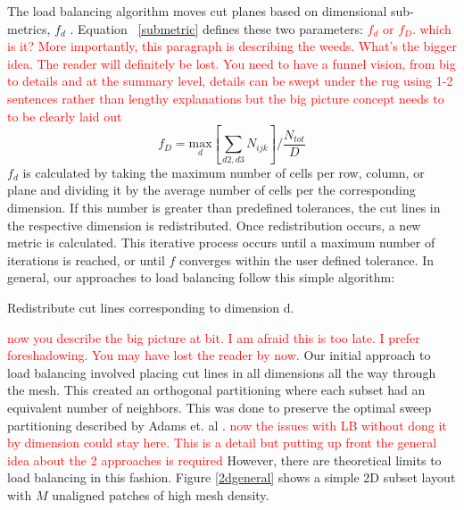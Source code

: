 \documentclass[letterpaper]{mandc2019}
\newcommand{\jcr}[1]{\textcolor{red}{#1}}
\begin{document}
The load balancing algorithm moves cut planes based on dimensional sub-metrics, $f_d$ . Equation ~\eqref{submetric} defines these two parameters:
\jcr{$f_d$ or $f_D$. which is it? More importantly, this paragraph is describing the weeds. What's the bigger idea. The reader will definitely be lost. You need to have a funnel vision, from big to details and at the summary level, details can be swept under the rug using 1-2 sentences rather than lengthy explanations but the big picture concept needs to to be clearly laid out}
\begin{equation}
f_{D} = \underset{d}{\text{max}}[\sum_{d2,d3} N_{ijk}]/\frac{N_{tot}}{D}
\label{submetric}
\end{equation}
$f_{d}$ is calculated by taking the maximum number of cells per row, column, or plane and dividing it by the average number of cells per the corresponding dimension. If this number is greater than predefined tolerances, the cut lines in the respective dimension is redistributed. Once redistribution occurs, a new metric is calculated. This iterative process occurs until a maximum number of iterations is reached, or until $f$ converges within the user defined tolerance. In general, our approaches to load balancing follow this simple algorithm:

\begin{algorithm}
\begin{algorithmic}

		\STATE Redistribute cut lines corresponding to dimension d.
	\ENDIF	
\ENDFOR
\ENDWHILE
\end{algorithmic}
\end{algorithm}

\jcr{now you describe the big picture at bit. I am afraid this is too late. I prefer foreshadowing. You may have lost the reader by now.}
Our initial approach to load balancing involved placing cut lines in all dimensions all the way through the mesh. This created an orthogonal partitioning where each subset had an equivalent number of neighbors. This was done to preserve the optimal sweep partitioning described by Adams et. al \cite{mpadams2015}. \jcr{now the issues with LB without dong it by dimension could stay here. This is a detail but putting up front the general idea about the 2 approaches is required} However, there are theoretical limits to load balancing in this fashion. Figure \ref{2dgeneral} shows a simple 2D subset layout with $M$ unaligned patches of high mesh density.
\end{document}
